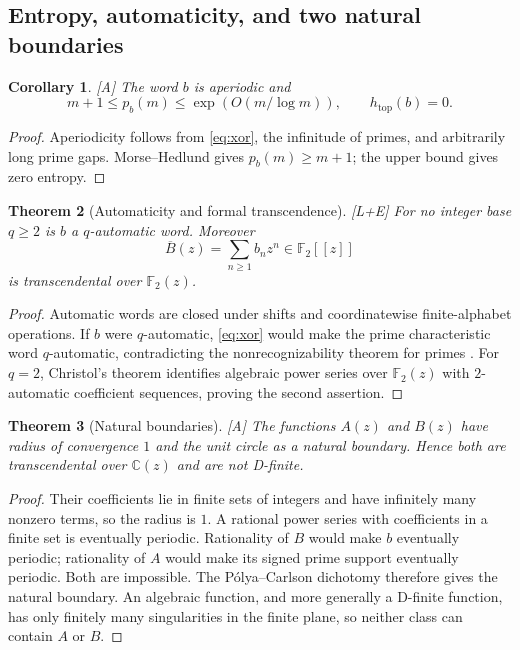 \documentclass[11pt]{article}
\newtheorem{theorem}{Theorem}[section]
\newtheorem{corollary}[theorem]{Corollary}
\theoremstyle{definition}
\theoremstyle{remark}
\newcommand{\Ftwo}{\mathbb F_{2}}
\newcommand{\status}[1]{\textnormal{\textcolor{accent}{\footnotesize[#1]}}}
\begin{document}
\subsection{Entropy, automaticity, and two natural boundaries}

\begin{corollary}\label{cor:zero-entropy}
\status{A}
The word $b$ is aperiodic and
\[
 m+1\le p_b(m)\le\exp(O(m/\log m)),
 \qquad h_{\mathrm{top}}(b)=0.
\]
\end{corollary}

\begin{proof}
Aperiodicity follows from \eqref{eq:xor}, the infinitude of primes, and arbitrarily long
prime gaps.  Morse--Hedlund gives $p_b(m)\ge m+1$; the upper bound gives zero entropy.
\end{proof}

\begin{theorem}[Automaticity and formal transcendence]\label{thm:automaticity}
\status{L+E}
For no integer base $q\ge2$ is $b$ a $q$-automatic word.  Moreover
\[
 \overline B(z)=\sum_{n\ge1}b_nz^n\in\Ftwo[[z]]
\]
is transcendental over $\Ftwo(z)$.
\end{theorem}

\begin{proof}
Automatic words are closed under shifts and coordinatewise finite-alphabet operations.
If $b$ were $q$-automatic, \eqref{eq:xor} would make the prime characteristic word
$q$-automatic, contradicting the nonrecognizability theorem for primes
\cite{HartmanisShank,AlloucheShallit}.  For $q=2$, Christol's theorem
\cite{ChristolEtAl} identifies algebraic power series over $\Ftwo(z)$ with $2$-automatic
coefficient sequences, proving the second assertion.
\end{proof}

\begin{theorem}[Natural boundaries]\label{thm:AB-natural-boundary}
\status{A}
The functions $A(z)$ and $B(z)$ have radius of convergence $1$ and the unit circle as a
natural boundary.  Hence both are transcendental over $\mathbb C(z)$ and are not
D-finite.
\end{theorem}

\begin{proof}
Their coefficients lie in finite sets of integers and have infinitely many nonzero terms,
so the radius is $1$.  A rational power series with coefficients in a finite set is
eventually periodic.  Rationality of $B$ would make $b$ eventually periodic; rationality
of $A$ would make its signed prime support eventually periodic.  Both are impossible.
The P\'olya--Carlson dichotomy \cite{Polya,Carlson} therefore gives the natural boundary.
An algebraic function, and more generally a D-finite function, has only finitely many
singularities in the finite plane, so neither class can contain $A$ or $B$.
\end{proof}
\end{document}
